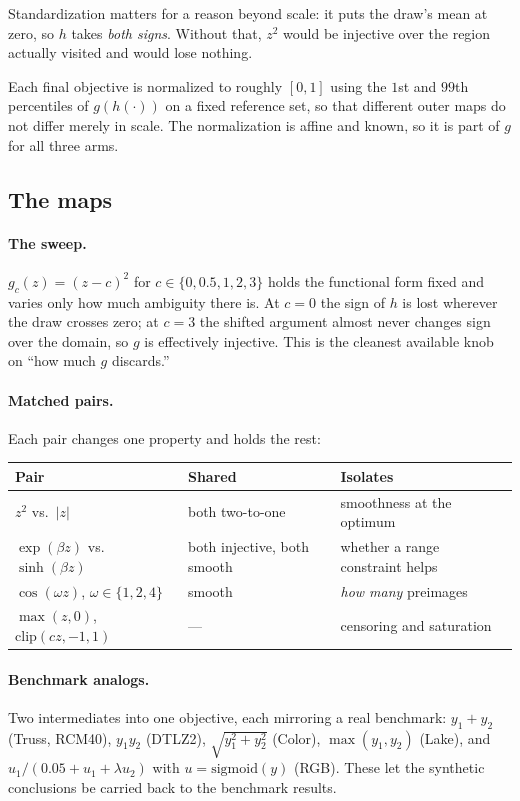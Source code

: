 \documentclass[11pt]{article}
\begin{document}
Standardization matters for a reason beyond scale: it puts the draw's mean at
zero, so $h$ takes \emph{both signs}. Without that, $z^2$ would be injective over
the region actually visited and would lose nothing.

Each final objective is normalized to roughly $[0,1]$ using the $1$st and $99$th
percentiles of $g(h(\cdot))$ on a fixed reference set, so that different outer
maps do not differ merely in scale. The normalization is affine and known, so it
is part of $g$ for all three arms.

\subsection{The maps}

\paragraph{The sweep.} $g_c(z)=(z-c)^2$ for $c\in\{0,0.5,1,2,3\}$ holds the
functional form fixed and varies only how much ambiguity there is. At $c=0$ the
sign of $h$ is lost wherever the draw crosses zero; at $c=3$ the shifted argument
almost never changes sign over the domain, so $g$ is effectively injective. This
is the cleanest available knob on ``how much $g$ discards.''

\paragraph{Matched pairs.} Each pair changes one property and holds the rest:
\begin{center}
\begin{tabular}{lll}
\toprule
Pair & Shared & Isolates \\
\midrule
$z^2$ vs.\ $|z|$ & both two-to-one & smoothness at the optimum \\
$\exp(\beta z)$ vs.\ $\sinh(\beta z)$ & both injective, both smooth & whether a range constraint helps \\
$\cos(\omega z)$, $\omega\in\{1,2,4\}$ & smooth & \emph{how many} preimages \\
$\max(z,0)$, $\mathrm{clip}(cz,-1,1)$ & --- & censoring and saturation \\
\bottomrule
\end{tabular}
\end{center}

\paragraph{Benchmark analogs.} Two intermediates into one objective, each
mirroring a real benchmark: $y_1+y_2$ (Truss, RCM40), $y_1y_2$ (DTLZ2),
$\sqrt{y_1^2+y_2^2}$ (Color), $\max(y_1,y_2)$ (Lake), and
$u_1/(0.05+u_1+\lambda u_2)$ with $u=\mathrm{sigmoid}(y)$ (RGB). These let the
synthetic conclusions be carried back to the benchmark results.
\end{document}
